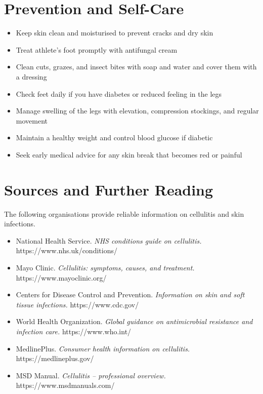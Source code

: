 \section*{Prevention and Self-Care}
\begin{itemize}
    \item Keep skin clean and moisturised to prevent cracks and dry skin
    \item Treat athlete's foot promptly with antifungal cream
    \item Clean cuts, grazes, and insect bites with soap and water and cover them with a dressing
    \item Check feet daily if you have diabetes or reduced feeling in the legs
    \item Manage swelling of the legs with elevation, compression stockings, and regular movement
    \item Maintain a healthy weight and control blood glucose if diabetic
    \item Seek early medical advice for any skin break that becomes red or painful
\end{itemize}

\section*{Sources and Further Reading}
The following organisations provide reliable information on cellulitis and skin infections.

\begin{itemize}
    \item National Health Service. \textit{NHS conditions guide on cellulitis.} https://www.nhs.uk/conditions/
    \item Mayo Clinic. \textit{Cellulitis: symptoms, causes, and treatment.} https://www.mayoclinic.org/
    \item Centers for Disease Control and Prevention. \textit{Information on skin and soft tissue infections.} https://www.cdc.gov/
    \item World Health Organization. \textit{Global guidance on antimicrobial resistance and infection care.} https://www.who.int/
    \item MedlinePlus. \textit{Consumer health information on cellulitis.} https://medlineplus.gov/
    \item MSD Manual. \textit{Cellulitis -- professional overview.} https://www.msdmanuals.com/
\end{itemize}
